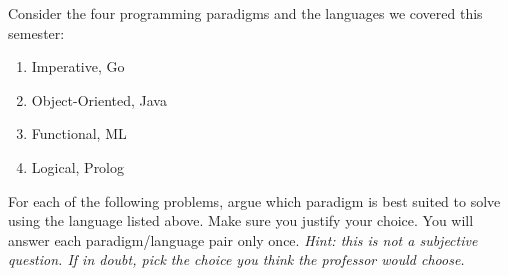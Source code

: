 \documentclass[addpoints]{exam}
\begin{document}
\begin{questions}
 
 \newpage
 
 \question[8]
 Consider the four programming paradigms and the languages we covered this semester:
 \begin{center}
  \begin{enumerate}
   \item Imperative, Go
   \item Object-Oriented, Java
   \item Functional, ML
   \item Logical, Prolog
  \end{enumerate}
 \end{center}
  
  For each of the following problems, argue which paradigm is best suited to solve using the language listed above. Make sure you justify your choice. You will answer each paradigm/language pair only once. \textit{Hint: this is not a subjective question. If in doubt, pick the choice you think the professor would choose.}\\\\
  
\end{questions}
\end{document}
